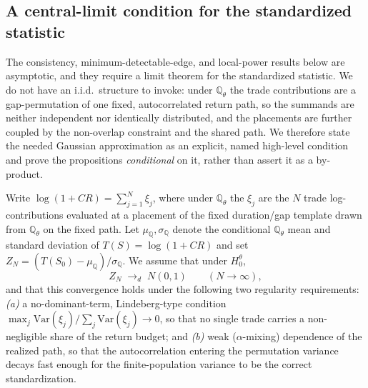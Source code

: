 \subsection{A central-limit condition for the standardized statistic}
\label{sec:clt-assumption}

The consistency, minimum-detectable-edge, and local-power results below are
asymptotic, and they require a limit theorem for the standardized statistic. We
do not have an i.i.d.\ structure to invoke: under $\mathbb{Q}_\theta$ the trade
contributions are a gap-permutation of one fixed, autocorrelated return path, so
the summands are neither independent nor identically distributed, and the
placements are further coupled by the non-overlap constraint and the shared path.
We therefore state the needed Gaussian approximation as an explicit, named
high-level condition and prove the propositions \emph{conditional} on it, rather
than assert it as a by-product.

\begin{assumption}
\label{ass:clt}
Write $\log(1+CR)=\sum_{j=1}^{N}\xi_j$, where under $\mathbb{Q}_\theta$ the $\xi_j$
are the $N$ trade log-contributions evaluated at a placement of the fixed
duration/gap template drawn from $\mathbb{Q}_\theta$ on the fixed path. Let
$\mu_{\mathbb Q},\sigma_{\mathbb Q}$ denote the conditional $\mathbb{Q}_\theta$
mean and standard deviation of $T(S)=\log(1+CR)$ and set
$Z_N=(T(S_0)-\mu_{\mathbb Q})/\sigma_{\mathbb Q}$. We assume that under
$H_0^\theta$,
\[
Z_N \;\to_d\; N(0,1) \qquad (N\to\infty),
\]
and that this convergence holds under the following two regularity requirements:
\emph{(a)} a no-dominant-term, Lindeberg-type condition
$\max_{j}\mathrm{Var}(\xi_j)/\sum_{j}\mathrm{Var}(\xi_j)\to0$, so that no
single trade carries a non-negligible share of the return budget; and
\emph{(b)} weak ($\alpha$-mixing) dependence of the realized path, so that the
autocorrelation entering the permutation variance decays fast enough for the
finite-population variance to be the correct standardization.
\end{assumption}

